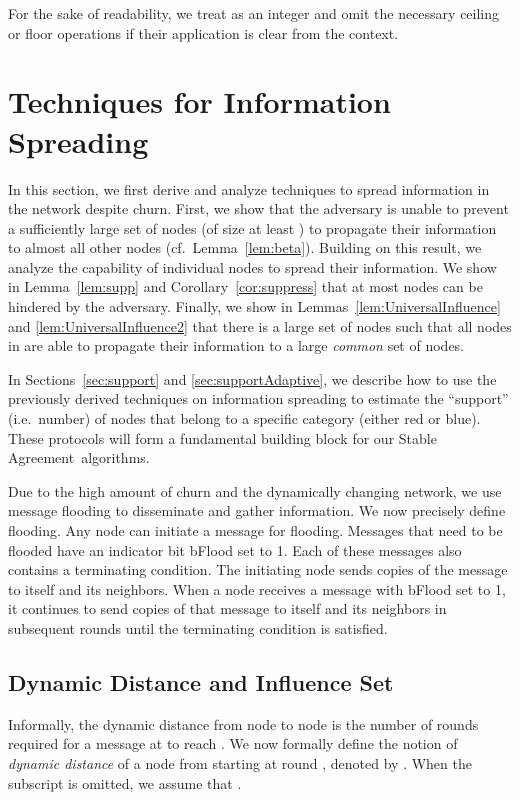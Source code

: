 \documentclass[leqno,11pt]{article}
\newcommand{\sa}{{\sc Stable Agreement}}
\begin{document}
For the sake of readability, we treat  as an integer and omit the
necessary ceiling or floor operations if their application is clear from the
context.










\section{Techniques for Information Spreading} \label{sec:techniques}
In this section, we first derive and analyze techniques to spread information in the network despite churn.
First, we show that the adversary is unable to prevent a sufficiently large set of nodes (of size at least ) to propagate their information to almost all other nodes (cf.\ Lemma~\ref{lem:beta}). 
Building on this result, we analyze the capability of individual nodes to spread their information.
We show in Lemma~\ref{lem:supp} and Corollary~\ref{cor:suppress} that at most  nodes can be hindered by the adversary.
Finally, we show in Lemmas~\ref{lem:UniversalInfluence} and \ref{lem:UniversalInfluence2} that there is a large set of nodes  such that all nodes in  are able to propagate their information to a large \emph{common} set of nodes.

In Sections~\ref{sec:support} and \ref{sec:supportAdaptive}, we describe how to use the previously derived techniques on information spreading to estimate the ``support'' (i.e.\ number) of nodes that belong to a specific category (either red or blue).
These protocols will form a fundamental building block for our \sa\ algorithms.

Due to the high amount of churn and the dynamically changing network, we use message flooding to disseminate and gather information. We now
precisely define flooding. Any node can initiate a  message for flooding.
Messages that need to be flooded have an indicator bit {\sc bFlood} set to 1.
Each of these messages also contains a terminating condition.  The initiating
node sends copies of the message to itself and its neighbors. When a node receives a
message with {\sc bFlood} set to 1, it continues  to send copies of that message to itself
and its neighbors in subsequent rounds until the terminating condition is
satisfied. 


\subsection{Dynamic Distance and Influence Set} \label{sec:dynamic}
Informally, the dynamic distance from node  to node  
is the number of rounds required for a message at  to reach .
We now formally define the notion of {\em dynamic distance} of a node  from  starting at
round , denoted by . When the subscript  is omitted, we
 assume that . 
\end{document}
